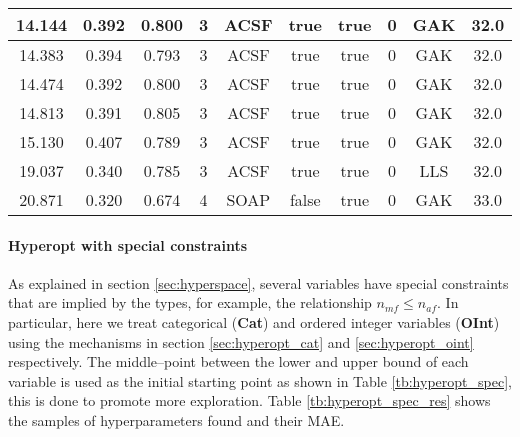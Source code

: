 \documentclass[12pt]{article}
\begin{document}
\begin{table}[H]
\begin{tabular}{|c|c|c|c|c|c|c|c|c|c|}
		14.144	& 0.392	& 0.800	& 3	& ACSF	& true	& true	& 0	& GAK	& 32.0	\\ \hline
		14.383	& 0.394	& 0.793	& 3	& ACSF	& true	& true	& 0	& GAK	& 32.0	\\ \hline
		14.474	& 0.392	& 0.800	& 3	& ACSF	& true	& true	& 0	& GAK	& 32.0	\\ \hline
		14.813	& 0.391	& 0.805	& 3	& ACSF	& true	& true	& 0	& GAK	& 32.0	\\ \hline
		15.130	& 0.407	& 0.789	& 3	& ACSF	& true	& true	& 0	& GAK	& 32.0	\\ \hline
		19.037	& 0.340	& 0.785	& 3	& ACSF	& true	& true	& 0	& LLS	& 32.0	\\ \hline
		20.871	& 0.320	& 0.674	& 4	& SOAP	& false	& true	& 0	& GAK	& 33.0	\\ \hline
	\end{tabular}
	\label{tab:hyperopt2}
\end{table}

\paragraph{Hyperopt with special constraints}
As explained in section \ref{sec:hyperspace}, several variables have special constraints that are implied by the types, for example, the relationship $n_{mf} \leq n_{af}$. 
In particular, here we treat categorical (\textbf{Cat}) and ordered integer variables (\textbf{OInt}) using the mechanisms in section \ref{sec:hyperopt_cat} and \ref{sec:hyperopt_oint} respectively.
The middle--point between the lower and upper bound of each variable is used as the initial starting point as shown in Table \ref{tb:hyperopt_spec}, this is done to promote more exploration.
Table \ref{tb:hyperopt_spec_res} shows the samples of hyperparameters found and their MAE.
\end{document}
